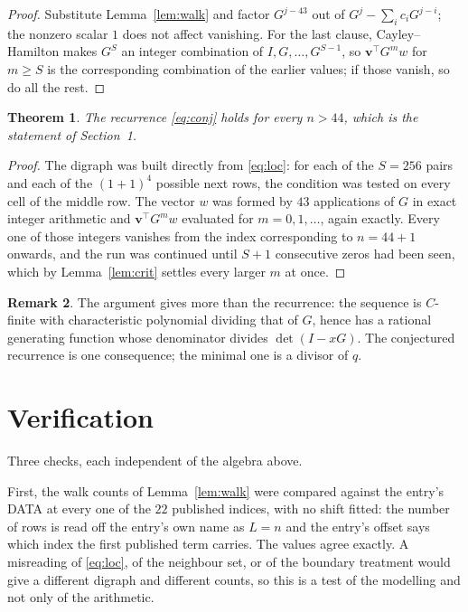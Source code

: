 \documentclass[11pt,a4paper]{article}
\theoremstyle{plain}
\newtheorem{theorem}{Theorem}
\theoremstyle{definition}
\newtheorem{remark}[theorem]{Remark}
\begin{document}
\begin{proof}
Substitute Lemma~\ref{lem:walk} and factor $G^{j-43}$ out of
$G^{j}-\sum_ic_iG^{j-i}$; the nonzero scalar $1$ does not affect
vanishing. For the last clause, Cayley--Hamilton makes $G^{S}$ an integer combination of
$I,G,\dots,G^{S-1}$, so $\mathbf{v}^{\!\top}G^{m}w$ for $m\ge S$ is the corresponding
combination of the earlier values; if those vanish, so do all the rest.
\end{proof}

\begin{theorem}
The recurrence \eqref{eq:conj} holds for every $n>44$, which is the statement of
Section~1.
\end{theorem}

\begin{proof}
The digraph was built directly from \eqref{eq:loc}: for each of the $S=256$ pairs and each
of the $(1+1)^{4}$ possible next rows, the condition was tested on every cell of
the middle row. The vector $w$ was formed by $43$ applications of $G$ in exact integer
arithmetic and $\mathbf{v}^{\!\top}G^{m}w$ evaluated for $m=0,1,\dots$, again exactly.
Every one of those integers vanishes from the index corresponding to $n=44+1$ onwards,
and the run was continued until $S+1$ consecutive zeros had been seen, which by
Lemma~\ref{lem:crit} settles every larger $m$ at once.
\end{proof}

\begin{remark}
The argument gives more than the recurrence: the sequence is $C$-finite with characteristic
polynomial dividing that of $G$, hence has a rational generating function whose denominator
divides $\det(I-xG)$. The conjectured recurrence is one consequence; the minimal one is a
divisor of $q$.
\end{remark}

\section{Verification}

Three checks, each independent of the algebra above.

First, the walk counts of Lemma~\ref{lem:walk} were compared against the entry's DATA at
every one of the $22$ published indices, with no shift fitted: the number of rows is
read off the entry's own name as $L=n$ and the entry's offset says which index the first
published term carries. The values agree exactly. A misreading of \eqref{eq:loc}, of the
neighbour set, or of the boundary treatment would give a different digraph and different
counts, so this is a test of the modelling and not only of the arithmetic.
\end{document}
